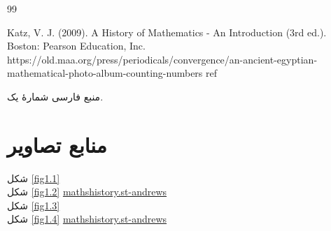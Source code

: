 \cleardoublepage
{}

\renewcommand{\bibname}{مراجع}
\begin{thebibliography}{99}
	\begin{LTRbibitems}
		\resetlatinfont
		Katz, V. J. (2009). A History of Mathematics - An Introduction (3rd ed.). Boston: Pearson Education, Inc.
		https://old.maa.org/press/periodicals/convergence/an-ancient-egyptian-mathematical-photo-album-counting-numbers
		ref
	\end{LTRbibitems}
	منبع فارسی شمارۀ یک.
\end{thebibliography}

\cleardoublepage
\chapter*{منابع تصاویر}
شکل \ref{fig1.1}
\dotfill
{}
\\
شکل \ref{fig1.2}
\dotfill
\href{https://mathshistory.st-andrews.ac.uk/HistTopics/Egyptian_numerals/}{mathshistory.st-andrews}
\\
شکل \ref{fig1.3}
\dotfill
{}
\\
شکل \ref{fig1.4}
\dotfill
\href{https://mathshistory.st-andrews.ac.uk/HistTopics/Egyptian_numerals/}{mathshistory.st-andrews}
\\
